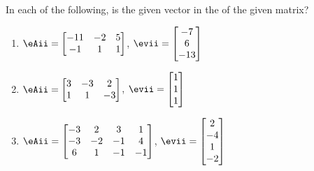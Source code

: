 \begin{exercise}  
In each of the following, is the given vector in the  of the given matrix?
\begin{enumerate}
\item \(\eAii=\begin{bmatrix} -11&-2&5
\\-1&1&1 \end{bmatrix}\),
\(\evii=\begin{bmatrix} -7\\6\\-13 \end{bmatrix}\)

\item \(\eAii=\begin{bmatrix} 3&-3&2
\\1&1&-3 \end{bmatrix}\),
\(\evii=\begin{bmatrix} 1
\\1
\\1 \end{bmatrix}\)


\item \(\eAii=\begin{bmatrix} -3&2&3&1
\\-3&-2&-1&4
\\6&1&-1&-1 \end{bmatrix}\),
\(\evii=\begin{bmatrix} 2
\\-4
\\1
\\-2 \end{bmatrix}\)


\end{enumerate}
\end{exercise}
